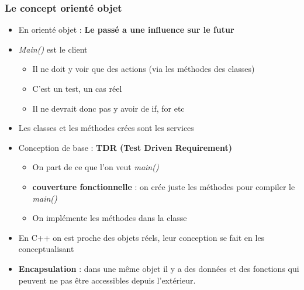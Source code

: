 \documentclass[12pt,a4paper]{article}
\begin{document}
\subsubsection{Le concept orienté objet}
\begin{itemize}
\item En orienté objet : \textbf{Le passé a une influence sur le futur}
\item \textit{Main()} est le client
\begin{itemize}
\item Il ne doit y voir que des actions (via les méthodes des classes)
\item C'est un test, un cas réel
\item Il ne devrait donc pas y avoir de if, for etc
\end{itemize}
\item Les classes et les méthodes crées sont les services
\item Conception de base : \textbf{TDR (Test Driven Requirement)}
\begin{itemize}
\item On part de ce que l'on veut \textit{main()}
\item\textbf{couverture fonctionnelle} : on crée juste les méthodes pour compiler le \textit{main()}
\item On implémente les méthodes dans la classe
\end{itemize}
\item En C++ on est proche des objets réels, leur conception se fait en les conceptualisant
\item \textbf{Encapsulation} : dans une même objet il y a des données et des fonctions qui peuvent ne pas être accessibles depuis l'extérieur.
\end{itemize}
\end{document}
